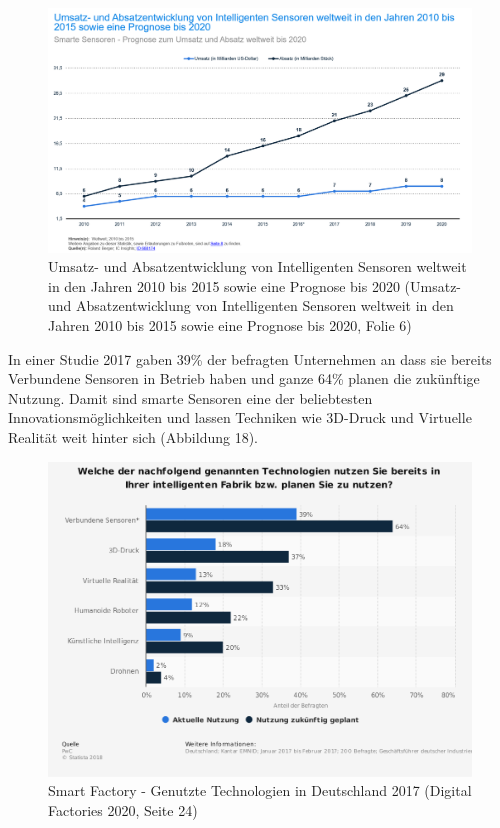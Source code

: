 \documentclass[a4paper,12pt]{scrartcl}
\begin{document}
\begin{figure}[H]
\centering
\includegraphics[scale=0.50]{picture/Prognose2020}
\caption{Umsatz- und Absatzentwicklung von Intelligenten Sensoren weltweit in den Jahren 2010 bis 2015 sowie eine Prognose bis 2020 (Umsatz- und Absatzentwicklung von Intelligenten Sensoren weltweit in den Jahren 2010 bis 2015 sowie eine Prognose bis 2020, Folie 6)}
\label{fig:Umsatz- und Absatzentwicklung von Intelligenten Sensoren weltweit in den Jahren 2010 bis 2015 sowie eine Prognose bis 2020}
\end{figure}

In einer Studie 2017 gaben 39\% der befragten Unternehmen an dass sie bereits Verbundene Sensoren in Betrieb haben und ganze 64\% planen die zukünftige Nutzung. Damit sind smarte Sensoren eine der beliebtesten Innovationsmöglichkeiten und lassen Techniken wie 3D-Druck und Virtuelle Realität weit hinter sich (Abbildung 18).\\

\begin{figure}[H]
\centering
\includegraphics[scale=0.45]{picture/SensorikBereiche}
\caption{Smart Factory - Genutzte Technologien in Deutschland 2017 (Digital Factories 2020, Seite 24)}
\label{fig:Smart Factory - Genutzte Technologien in Deutschland 2017}
\end{figure}
\end{document}
